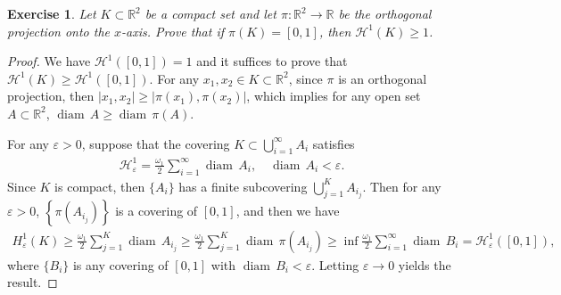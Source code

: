 \documentclass[11pt]{book}
\newtheorem{exercise}{Exercise}[section]
\theoremstyle{definition}
\numberwithin{equation}{chapter}
\def\H{{\mathcal H}}
\def\diam{{\operatorname{diam}\,}}
\begin{document}
\begin{exercise}
Let $K\subset\mathbb{R}^2$ be a compact set and let $\pi:\mathbb{R}^2\to\mathbb{R}$ be the orthogonal projection onto the $x$-axis. Prove that if $\pi(K)=[0,1]$, then
$\H^1(K)\geq 1$.
\end{exercise}
\begin{proof}
We have $\H^1([0,1]) = 1$ and it suffices to prove that $\H^1(K) \geq \H^1([0,1])$. For any $x_1, x_2 \in K \subset \mathbb{R}^2$, since $\pi$ is an orthogonal projection, then $\left|x_1,x_2\right| \geq \left|\pi(x_1),\pi(x_2)\right|$, which implies for any open set $A \subset \mathbb{R}^2$, $\diam A \geq \diam \pi(A)$. 

For any $\varepsilon > 0$, suppose that the covering $K \subset \bigcup^\infty_{i=1} A_i$ satisfies \begin{align*}
    \H^1_{\varepsilon} = \frac{\omega_1}{2} \sum^\infty_{i=1}\diam A_i, \quad \diam A_i < \varepsilon.
\end{align*}
Since $K$ is compact, then $\{A_i\}$ has a finite subcovering $\bigcup^K_{j=1}A_{i_j}$. Then for any $\varepsilon > 0$, $\left\{\pi(A_{i_j})\right\}$ is a covering of $[0,1]$, and then we have
\begin{align*}
    H^1_\varepsilon(K) \geq \frac{\omega_1}{2} \sum^K_{j=1} \diam A_{i_j} \geq \frac{\omega_1}{2} \sum^K_{j=1} \diam \pi(A_{i_j}) \geq \inf \frac{\omega_1}{2} \sum^\infty_{i=1} \diam B_i = \H^1_{\varepsilon}([0,1]),
\end{align*}
where $\{B_i\}$ is any covering of $[0,1]$ with $\diam B_i < \varepsilon$. Letting $\varepsilon \to 0$ yields the result.
\end{proof}

\medskip
\end{document}
